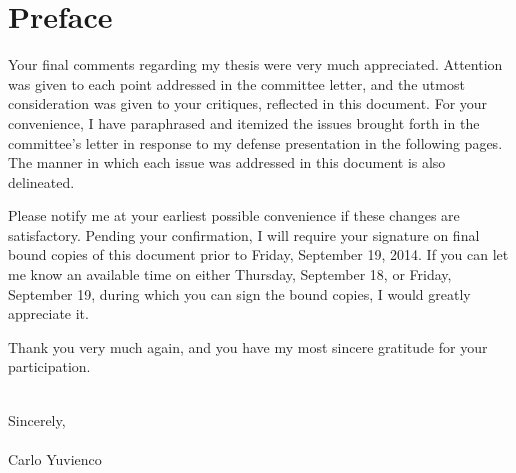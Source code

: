 \section*{Preface}
Your final comments regarding my thesis were very much appreciated.  Attention
was given to each point addressed in the committee letter, and the utmost
consideration was given to your critiques, reflected in this document.
For your convenience, I have paraphrased and itemized the issues
brought forth in the committee's letter in response to my defense presentation in the
following pages.  The manner in which each issue was addressed in this document
is also delineated. 

Please notify me at your earliest possible convenience if these changes are
satisfactory. Pending your confirmation, I will require your signature on final
bound copies of this document prior to Friday, September 19, 2014. If you can
let me know an available time on either Thursday, September 18, or Friday,
September 19, during which you can sign the bound copies, I would greatly
appreciate it.

Thank you very much again, and you have my most sincere gratitude for your
participation.

\hspace{0pt}\\
Sincerely,
\hspace{0pt}\\
\hspace{0pt}\\
Carlo Yuvienco

